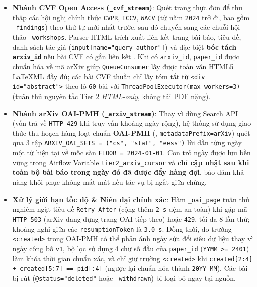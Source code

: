 \begin{itemize}
  \item \textbf{Nhánh CVF Open Access (\texttt{\_cvf\_stream})}: Quét trang thực đơn  để thu thập các hội nghị chính thức \texttt{CVPR}, \texttt{ICCV}, \texttt{WACV} (từ năm \texttt{2024} trở đi, bao gồm \texttt{\_findings}) theo thứ tự mới nhất trước, sau đó chuyển sang các chuỗi hội thảo \texttt{\_workshops}. Parser HTML trích xuất liên kết trang bài báo, tiêu đề, danh sách tác giả (\texttt{input[name="query\_author"]}) và đặc biệt \textbf{bóc tách \texttt{arxiv\_id}} nếu bài CVF có gắn liên kết . Khi có \texttt{arxiv\_id}, \texttt{paper\_id} được chuẩn hóa về mã arXiv giúp \texttt{QueueConsumer} lấy được toàn văn HTML5 LaTeXML đầy đủ; các bài CVF thuần chỉ lấy tóm tắt từ \texttt{<div id="abstract">} theo lô \texttt{60} bài với \texttt{ThreadPoolExecutor(max\_workers=3)} (tuân thủ nguyên tắc Tier 2 \textit{HTML-only}, không tải PDF nặng).
  \item \textbf{Nhánh arXiv OAI-PMH (\texttt{\_arxiv\_stream})}: Thay vì dùng Search API (vốn trả về \texttt{HTTP 429} khi truy vấn khoảng ngày rộng), hệ thống sử dụng giao thức thu hoạch hàng loạt chuẩn \textbf{OAI-PMH} (, \texttt{metadataPrefix=arXiv}) quét qua 3 tập \texttt{ARXIV\_OAI\_SETS = ("cs", "stat", "eess")} lùi dần từng ngày một từ hiện tại về mốc sàn \texttt{FLOOR = 2024-01-01}. Con trỏ ngày được lưu bền vững trong Airflow Variable \texttt{tier2\_arxiv\_cursor} và \textbf{chỉ cập nhật sau khi toàn bộ bài báo trong ngày đó đã được đẩy hàng đợi}, bảo đảm khả năng khôi phục không mất mát nếu tác vụ bị ngắt giữa chừng.
  \item \textbf{Xử lý giới hạn tốc độ \& Niên đại chính xác}: Hàm \texttt{\_oai\_page} tuân thủ nghiêm ngặt tiêu đề \texttt{Retry-After} (cộng thêm \texttt{2 s} đệm an toàn) khi gặp mã \texttt{HTTP 503} (arXiv đang dựng trang OAI tiếp theo) hoặc \texttt{429}, tối đa 8 lần thử; khoảng nghỉ giữa các \texttt{resumptionToken} là \texttt{3.0 s}. Đồng thời, do trường \texttt{<created>} trong OAI-PMH có thể phản ánh ngày sửa đổi siêu dữ liệu thay vì ngày công bố \texttt{v1}, bộ lọc sử dụng 4 chữ số đầu của \texttt{paper\_id} (\texttt{YYMM >= 2401}) làm khóa thời gian chuẩn xác, và chỉ giữ trường \texttt{<created>} khi \texttt{created[2:4] + created[5:7] == pid[:4]} (ngược lại chuẩn hóa thành \texttt{20YY-MM}). Các bài bị rút (\texttt{@status="deleted"} hoặc \texttt{\_withdrawn}) bị loại bỏ ngay tại nguồn.
\end{itemize}

